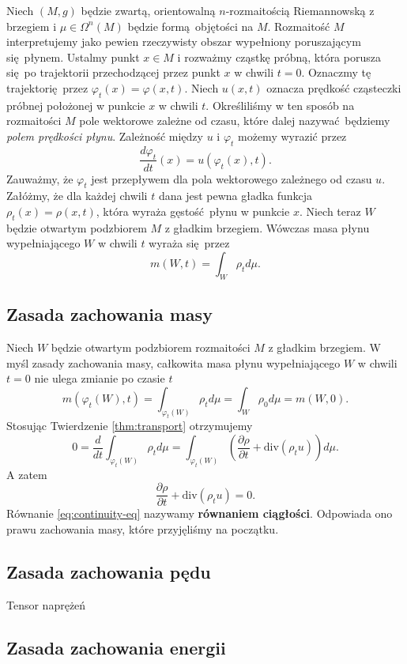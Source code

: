 Niech \((M, g)\) będzie zwartą, orientowalną \(n\)-rozmaitością Riemannowską z brzegiem i \(\mu \in \Omega^n(M)\) będzie formą objętości na \(M\). Rozmaitość \(M\) interpretujemy jako pewien rzeczywisty obszar wypełniony poruszającym się płynem. Ustalmy punkt \(x\in M\) i rozważmy cząstkę próbną, która porusza się po trajektorii przechodzącej przez punkt \(x\) w chwili \(t=0\). Oznaczmy tę trajektorię przez \(\varphi_t(x)=\varphi(x,t)\). Niech \(u(x, t)\) oznacza prędkość cząsteczki próbnej położonej w punkcie \(x\) w chwili \(t\). Określiliśmy w ten sposób na rozmaitości \(M\) pole wektorowe zależne od czasu, które dalej nazywać będziemy \emph{polem prędkości płynu}. Zależność między \(u\) i \(\varphi_t\) możemy wyrazić przez
\begin{equation}\label{eq:first-step}
    \frac{d\varphi_t}{dt}(x) = u(\varphi_t(x), t). 
\end{equation}
Zauważmy, że \(\varphi_t\) jest przepływem dla pola wektorowego zależnego od czasu \(u\). Załóżmy, że dla każdej chwili \(t\) dana jest pewna gładka funkcja \(\rho_t(x)=\rho(x,t)\), która wyraża gęstość płynu w punkcie \(x\). Niech teraz \(W\) będzie otwartym podzbiorem \(M\) z gładkim brzegiem. Wówczas masa płynu wypełniającego \(W\) w chwili \(t\) wyraża się przez
\begin{equation}\label{eq:mass}
    m(W,t) = \int_W \rho_t d\mu.
\end{equation}

\subsection{Zasada zachowania masy} Niech \(W\) będzie otwartym podzbiorem rozmaitości \(M\) z gładkim brzegiem. W myśl zasady zachowania masy, całkowita masa płynu wypełniającego \(W\) w chwili \(t=0\) nie ulega zmianie po czasie \(t\)
\begin{equation}\label{eq:mass-cons-1}
    m\left(\varphi_t(W), t\right) = \int_{\varphi_t(W)}\rho_t d\mu = \int_W \rho_0 d\mu = m(W, 0).
\end{equation}
Stosując Twierdzenie \ref{thm:transport} otrzymujemy
\begin{equation*}
    0 = \frac{d}{dt}\int_{\varphi_t(W)} \rho_t d\mu = \int_{\varphi_t(W)}\left(\frac{\partial \rho}{\partial t} + \mathrm{div}(\rho_t u) \right) d\mu.
\end{equation*}
A zatem
\begin{equation}\label{eq:continuity-eq}
\frac{\partial \rho}{\partial t} + \mathrm{div}(\rho_t u) = 0. 
\end{equation}
Równanie \eqref{eq:continuity-eq} nazywamy \textbf{równaniem ciągłości}. Odpowiada ono prawu zachowania masy, które przyjęliśmy na początku.
\subsection{Zasada zachowania pędu}
Tensor naprężeń
\subsection{Zasada zachowania energii}

